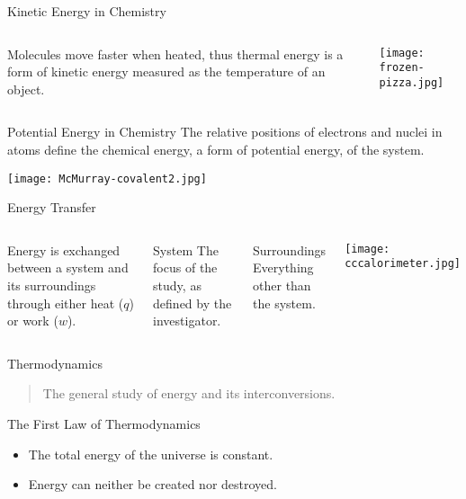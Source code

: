 \documentclass[notes=only]{beamer}
\begin{document}
\begin{frame}{Kinetic Energy in Chemistry}
	\begin{columns}
		Molecules move faster when heated, thus \alert{thermal energy} is a form
		of kinetic energy measured as the \alert{temperature} of an object.
		\begin{center}
			\texttt{[image: frozen-pizza.jpg]}
		\end{center}
	\end{columns}
\end{frame}

\begin{frame}{Potential Energy in Chemistry}
	The relative positions of electrons and nuclei in atoms define the
	\alert{chemical energy}, a form of potential energy, of the system.
	\begin{center}
		\texttt{[image: McMurray-covalent2.jpg]}
	\end{center}
\end{frame}
	
\begin{frame}{Energy Transfer}
	\begin{columns}
		\column{0.56\textwidth}
		Energy is \alert{exchanged} between a system and its surroundings through
		either \alert{heat} ($q$) or \alert{work} ($w$).

		\bigskip

		\begin{block}{System}
			The focus of the study, as defined by the investigator.
		\end{block}

		\begin{block}{Surroundings}
			Everything other than the system.
		\end{block}
	
		\column{0.44\textwidth}
		\begin{center}
			\texttt{[image: cccalorimeter.jpg]}
		\end{center}
	\end{columns}
\end{frame}

\begin{frame}{Thermodynamics}
	\begin{quote}
		The general study of energy and its interconversions.
	\end{quote}

	\bigskip

	\begin{block}{The First Law of Thermodynamics}
		\begin{itemize}
			\item The total energy of the universe is constant.
			\item Energy can neither be created nor destroyed.
		\end{itemize}
	\end{block}
\end{frame}
\end{document}
